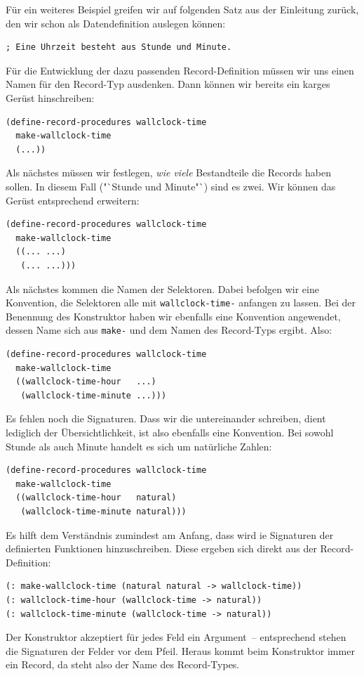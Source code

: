 Für ein weiteres Beispiel greifen wir auf folgenden Satz aus der
Einleitung zurück, den wir schon als Datendefinition auslegen können:
%
\begin{verbatim}
; Eine Uhrzeit besteht aus Stunde und Minute.
\end{verbatim}
%
Für die Entwicklung der dazu passenden Record-Definition müssen wir
uns einen Namen für den Record-Typ ausdenken.  Dann können wir bereits
ein karges Gerüst hinschreiben:
%
\begin{verbatim}
(define-record-procedures wallclock-time
  make-wallclock-time
  (...))
\end{verbatim}
%
Als nächstes müssen wir festlegen, \emph{wie viele} Bestandteile die
Records haben sollen.  In diesem Fall ("`Stunde und Minute"`) sind es
zwei.  Wir können das Gerüst entsprechend erweitern:
%
\begin{verbatim}
(define-record-procedures wallclock-time
  make-wallclock-time
  ((... ...)
   (... ...)))
\end{verbatim}
%
Als nächstes kommen die Namen der Selektoren.  Dabei befolgen wir eine
Konvention, die Selektoren alle mit \texttt{wallclock-time-} anfangen
zu lassen.  Bei der Benennung des Konstruktor haben wir ebenfalls
eine Konvention angewendet, dessen Name sich aus \texttt{make-} und
dem Namen des Record-Typs ergibt.  Also:
%
\begin{verbatim}
(define-record-procedures wallclock-time
  make-wallclock-time
  ((wallclock-time-hour   ...)
   (wallclock-time-minute ...)))
\end{verbatim}
%
Es fehlen noch die Signaturen.  Dass wir die untereinander schreiben,
dient lediglich der Übersichtlichkeit, ist also ebenfalls eine
Konvention.  Bei sowohl Stunde als auch Minute handelt es sich um
natürliche Zahlen:
%
\begin{verbatim}
(define-record-procedures wallclock-time
  make-wallclock-time
  ((wallclock-time-hour   natural)
   (wallclock-time-minute natural)))
\end{verbatim}
%
Es hilft dem Verständnis zumindest am Anfang, dass wird ie Signaturen
der definierten Funktionen hinzuschreiben.  Diese ergeben sich direkt
aus der Record-Definition:
%
\begin{verbatim}
(: make-wallclock-time (natural natural -> wallclock-time))
(: wallclock-time-hour (wallclock-time -> natural))
(: wallclock-time-minute (wallclock-time -> natural))
\end{verbatim}
%
Der Konstruktor akzeptiert für jedes Feld ein Argument~-- entsprechend
stehen die Signaturen der Felder vor dem Pfeil.  Heraus kommt beim
Konstruktor immer ein Record, da steht also der Name des Record-Types.

